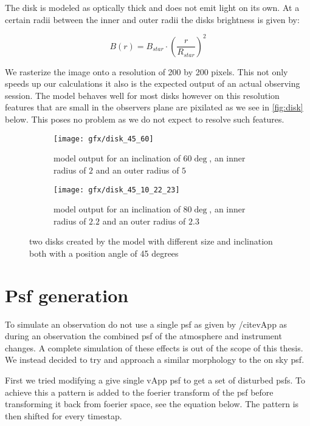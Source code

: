 The disk is modeled as optically thick and does not emit light on its own. At a certain radii between the inner and outer radii the disks brightness is given by:

\begin{equation}
B(r) = B_{star} \cdot {\left(\frac{r}{R_{star}}\right)}^2
\end{equation}

We rasterize the image onto a resolution of 200 by 200 pixels. This not only speeds up our calculations it also is the expected output of an actual observing session. The model behaves well for most disks however on this resolution features that are small in the observers plane are pixilated as we see in \autoref{fig:disk} below. This poses no problem as we do not expect to resolve such features.

\begin{figure}[h!]
  \begin{subfigure}[b]{0.5\textwidth}
    \texttt{[image: gfx/disk\_45\_60]}
    \caption{model output for an inclination of $60\deg$, an inner radius of $2$ and an outer radius of $5$}
  \end{subfigure}
  \begin{subfigure}[b]{0.5\textwidth}
    \texttt{[image: gfx/disk\_45\_10\_22\_23]}
    \caption{model output for an inclination of $80\deg$, an inner radius of $2.2$ and an outer radius of $2.3$}
  \end{subfigure}
  \caption{two disks created by the model with different size and inclination both with a position angle of 45 degrees}
  \label{fig:disk}
\end{figure}





\section{Psf generation}

To simulate an observation do not use a single psf as given by /cite{vApp} as during an observation the combined psf of the atmosphere and instrument changes. A complete simulation of these effects is out of the scope of this thesis. We instead decided to try and approach a similar morphology to the on sky psf. 

First we tried modifying a give single vApp psf to get a set of disturbed psfs. To achieve this a pattern is added to the foerier transform of the psf before transforming it back from foerier space, see the equation below. The pattern is then shifted for every timestap.

